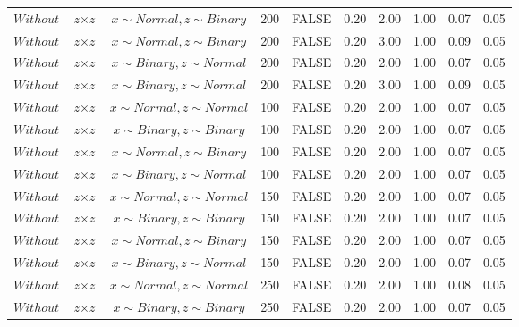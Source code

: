 \begin{longtable}{lccccccccc}
  $Without$ & $\textit{z} \times \textit{z}$ & $\textit{x} \sim Normal, \textit{z} \sim Binary$ & 200 & FALSE & 0.20 & 2.00 & 1.00 & 0.07 & 0.05 \\ 
  $Without$ & $\textit{z} \times \textit{z}$ & $\textit{x} \sim Normal, \textit{z} \sim Binary$ & 200 & FALSE & 0.20 & 3.00 & 1.00 & 0.09 & 0.05 \\ 
  $Without$ & $\textit{z} \times \textit{z}$ & $\textit{x} \sim Binary, \textit{z} \sim Normal$ & 200 & FALSE & 0.20 & 2.00 & 1.00 & 0.07 & 0.05 \\ 
  $Without$ & $\textit{z} \times \textit{z}$ & $\textit{x} \sim Binary, \textit{z} \sim Normal$ & 200 & FALSE & 0.20 & 3.00 & 1.00 & 0.09 & 0.05 \\ 
  $Without$ & $\textit{z} \times \textit{z}$ & $\textit{x} \sim Normal , \textit{z} \sim Normal$ & 100 & FALSE & 0.20 & 2.00 & 1.00 & 0.07 & 0.05 \\ 
  $Without$ & $\textit{z} \times \textit{z}$ & $\textit{x} \sim Binary, \textit{z} \sim Binary$ & 100 & FALSE & 0.20 & 2.00 & 1.00 & 0.07 & 0.05 \\ 
  $Without$ & $\textit{z} \times \textit{z}$ & $\textit{x} \sim Normal, \textit{z} \sim Binary$ & 100 & FALSE & 0.20 & 2.00 & 1.00 & 0.07 & 0.05 \\ 
  $Without$ & $\textit{z} \times \textit{z}$ & $\textit{x} \sim Binary, \textit{z} \sim Normal$ & 100 & FALSE & 0.20 & 2.00 & 1.00 & 0.07 & 0.05 \\ 
  $Without$ & $\textit{z} \times \textit{z}$ & $\textit{x} \sim Normal , \textit{z} \sim Normal$ & 150 & FALSE & 0.20 & 2.00 & 1.00 & 0.07 & 0.05 \\ 
  $Without$ & $\textit{z} \times \textit{z}$ & $\textit{x} \sim Binary, \textit{z} \sim Binary$ & 150 & FALSE & 0.20 & 2.00 & 1.00 & 0.07 & 0.05 \\ 
  $Without$ & $\textit{z} \times \textit{z}$ & $\textit{x} \sim Normal, \textit{z} \sim Binary$ & 150 & FALSE & 0.20 & 2.00 & 1.00 & 0.07 & 0.05 \\ 
  $Without$ & $\textit{z} \times \textit{z}$ & $\textit{x} \sim Binary, \textit{z} \sim Normal$ & 150 & FALSE & 0.20 & 2.00 & 1.00 & 0.07 & 0.05 \\ 
  $Without$ & $\textit{z} \times \textit{z}$ & $\textit{x} \sim Normal , \textit{z} \sim Normal$ & 250 & FALSE & 0.20 & 2.00 & 1.00 & 0.08 & 0.05 \\ 
  $Without$ & $\textit{z} \times \textit{z}$ & $\textit{x} \sim Binary, \textit{z} \sim Binary$ & 250 & FALSE & 0.20 & 2.00 & 1.00 & 0.07 & 0.05 \\ 

\end{longtable}
